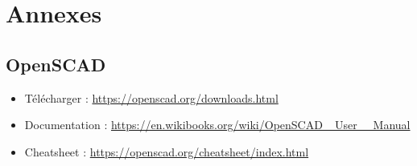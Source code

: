 \section{Annexes}

\subsection{OpenSCAD}

\begin{itemize}
	\item Télécharger : \href{https://openscad.org/downloads.html}{https://openscad.org/downloads.html}
	\item Documentation : \href{https://en.wikibooks.org/wiki/OpenSCAD_User_Manual}{https://en.wikibooks.org/wiki/OpenSCAD\_ User \_ Manual}
	\item Cheatsheet : \href{https://openscad.org/cheatsheet/index.html}{https://openscad.org/cheatsheet/index.html}
\end{itemize}